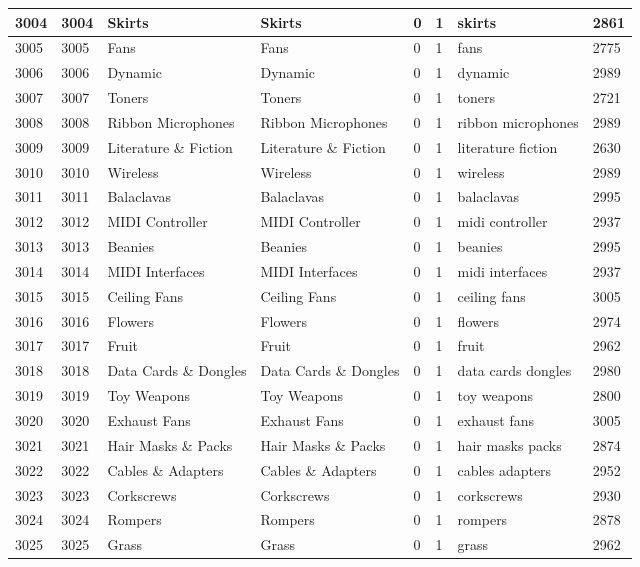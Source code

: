 \begin{longtable}{|l|l|l|l|l|l|l|l|}
3004 & 3004 & Skirts & Skirts & 0 & 1 & skirts & 2861 \\ \hline 
3005 & 3005 & Fans & Fans & 0 & 1 & fans & 2775 \\ \hline 
3006 & 3006 & Dynamic & Dynamic & 0 & 1 & dynamic & 2989 \\ \hline 
3007 & 3007 & Toners & Toners & 0 & 1 & toners & 2721 \\ \hline 
3008 & 3008 & Ribbon Microphones & Ribbon Microphones & 0 & 1 & ribbon microphones & 2989 \\ \hline 
3009 & 3009 & Literature \& Fiction & Literature \& Fiction & 0 & 1 & literature fiction & 2630 \\ \hline 
3010 & 3010 & Wireless & Wireless & 0 & 1 & wireless & 2989 \\ \hline 
3011 & 3011 & Balaclavas & Balaclavas & 0 & 1 & balaclavas & 2995 \\ \hline 
3012 & 3012 & MIDI Controller & MIDI Controller & 0 & 1 & midi controller & 2937 \\ \hline 
3013 & 3013 & Beanies & Beanies & 0 & 1 & beanies & 2995 \\ \hline 
3014 & 3014 & MIDI Interfaces & MIDI Interfaces & 0 & 1 & midi interfaces & 2937 \\ \hline 
3015 & 3015 & Ceiling Fans & Ceiling Fans & 0 & 1 & ceiling fans & 3005 \\ \hline 
3016 & 3016 & Flowers & Flowers & 0 & 1 & flowers & 2974 \\ \hline 
3017 & 3017 & Fruit & Fruit & 0 & 1 & fruit & 2962 \\ \hline 
3018 & 3018 & Data Cards \& Dongles & Data Cards \& Dongles & 0 & 1 & data cards dongles & 2980 \\ \hline 
3019 & 3019 & Toy Weapons & Toy Weapons & 0 & 1 & toy weapons & 2800 \\ \hline 
3020 & 3020 & Exhaust Fans & Exhaust Fans & 0 & 1 & exhaust fans & 3005 \\ \hline 
3021 & 3021 & Hair Masks \& Packs & Hair Masks \& Packs & 0 & 1 & hair masks packs & 2874 \\ \hline 
3022 & 3022 & Cables \& Adapters & Cables \& Adapters & 0 & 1 & cables adapters & 2952 \\ \hline 
3023 & 3023 & Corkscrews & Corkscrews & 0 & 1 & corkscrews & 2930 \\ \hline 
3024 & 3024 & Rompers & Rompers & 0 & 1 & rompers & 2878 \\ \hline 
3025 & 3025 & Grass & Grass & 0 & 1 & grass & 2962 \\ \hline 

\end{longtable}
